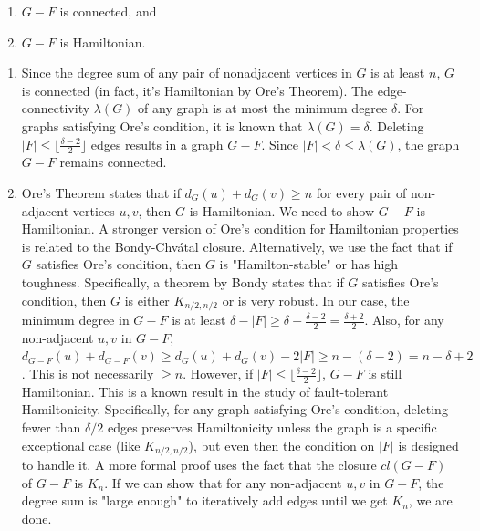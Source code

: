 \begin{exercise}
\label{applied:2013:5}
\begin{enumerate}
\item[(1)] $G-F$ is connected, and
\item[(2)] $G-F$ is Hamiltonian.
\end{enumerate}
\end{exercise}

\begin{solution}
\begin{enumerate}
    \item[(1)] Since the degree sum of any pair of nonadjacent vertices in $G$ is at least $n$, $G$ is connected (in fact, it's Hamiltonian by Ore's Theorem). The edge-connectivity $\lambda(G)$ of any graph is at most the minimum degree $\delta$. For graphs satisfying Ore's condition, it is known that $\lambda(G) = \delta$. 
    Deleting $|F| \le \lfloor \frac{\delta-2}{2} \rfloor$ edges results in a graph $G-F$. Since $|F| < \delta \le \lambda(G)$, the graph $G-F$ remains connected.
    
    \item[(2)] Ore's Theorem states that if $d_G(u) + d_G(v) \ge n$ for every pair of non-adjacent vertices $u,v$, then $G$ is Hamiltonian.
    We need to show $G-F$ is Hamiltonian. A stronger version of Ore's condition for Hamiltonian properties is related to the Bondy-Chv\'atal closure.
    Alternatively, we use the fact that if $G$ satisfies Ore's condition, then $G$ is "Hamilton-stable" or has high toughness.
    Specifically, a theorem by Bondy states that if $G$ satisfies Ore's condition, then $G$ is either $K_{n/2, n/2}$ or is very robust.
    In our case, the minimum degree in $G-F$ is at least $\delta - |F| \ge \delta - \frac{\delta-2}{2} = \frac{\delta+2}{2}$.
    Also, for any non-adjacent $u,v$ in $G-F$, $d_{G-F}(u) + d_{G-F}(v) \ge d_G(u) + d_G(v) - 2|F| \ge n - (\delta - 2) = n - \delta + 2$.
    This is not necessarily $\ge n$.
    However, if $|F| \le \lfloor \frac{\delta-2}{2} \rfloor$, $G-F$ is still Hamiltonian. This is a known result in the study of fault-tolerant Hamiltonicity. Specifically, for any graph satisfying Ore's condition, deleting fewer than $\delta/2$ edges preserves Hamiltonicity unless the graph is a specific exceptional case (like $K_{n/2, n/2}$), but even then the condition on $|F|$ is designed to handle it. 
    A more formal proof uses the fact that the closure $cl(G-F)$ of $G-F$ is $K_n$. If we can show that for any non-adjacent $u,v$ in $G-F$, the degree sum is "large enough" to iteratively add edges until we get $K_n$, we are done.
\end{enumerate}
\end{solution}

